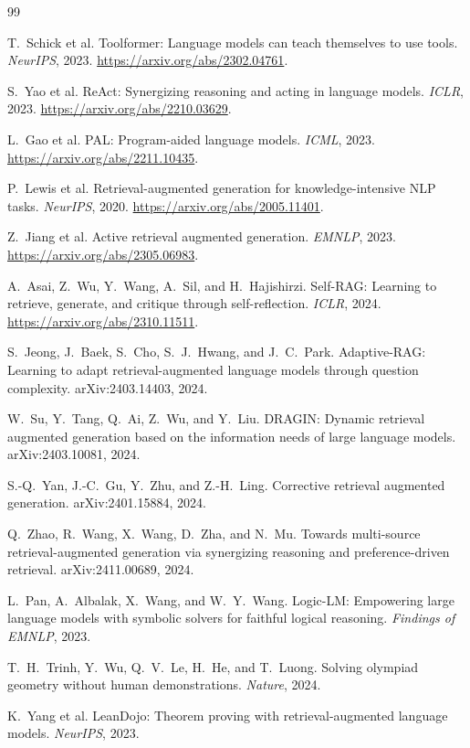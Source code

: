 \documentclass[11pt]{article}
\begin{document}
\begin{thebibliography}{99}

T.~Schick et al.
Toolformer: Language models can teach themselves to use tools.
\emph{NeurIPS}, 2023.
\url{https://arxiv.org/abs/2302.04761}.

S.~Yao et al.
ReAct: Synergizing reasoning and acting in language models.
\emph{ICLR}, 2023.
\url{https://arxiv.org/abs/2210.03629}.

L.~Gao et al.
PAL: Program-aided language models.
\emph{ICML}, 2023.
\url{https://arxiv.org/abs/2211.10435}.

P.~Lewis et al.
Retrieval-augmented generation for knowledge-intensive NLP tasks.
\emph{NeurIPS}, 2020.
\url{https://arxiv.org/abs/2005.11401}.

Z.~Jiang et al.
Active retrieval augmented generation.
\emph{EMNLP}, 2023.
\url{https://arxiv.org/abs/2305.06983}.

A.~Asai, Z.~Wu, Y.~Wang, A.~Sil, and H.~Hajishirzi.
Self-RAG: Learning to retrieve, generate, and critique through self-reflection.
\emph{ICLR}, 2024.
\url{https://arxiv.org/abs/2310.11511}.

S.~Jeong, J.~Baek, S.~Cho, S.~J.~Hwang, and J.~C.~Park.
Adaptive-RAG: Learning to adapt retrieval-augmented language models through
question complexity.  arXiv:2403.14403, 2024.

W.~Su, Y.~Tang, Q.~Ai, Z.~Wu, and Y.~Liu.
DRAGIN: Dynamic retrieval augmented generation based on the information needs
of large language models.  arXiv:2403.10081, 2024.

S.-Q.~Yan, J.-C.~Gu, Y.~Zhu, and Z.-H.~Ling.
Corrective retrieval augmented generation.  arXiv:2401.15884, 2024.

Q.~Zhao, R.~Wang, X.~Wang, D.~Zha, and N.~Mu.
Towards multi-source retrieval-augmented generation via synergizing reasoning
and preference-driven retrieval.  arXiv:2411.00689, 2024.

L.~Pan, A.~Albalak, X.~Wang, and W.~Y.~Wang.
Logic-LM: Empowering large language models with symbolic solvers for faithful
logical reasoning.  \emph{Findings of EMNLP}, 2023.

T.~H.~Trinh, Y.~Wu, Q.~V.~Le, H.~He, and T.~Luong.
Solving olympiad geometry without human demonstrations.
\emph{Nature}, 2024.

K.~Yang et al.
LeanDojo: Theorem proving with retrieval-augmented language models.
\emph{NeurIPS}, 2023.


\end{thebibliography}
\end{document}
